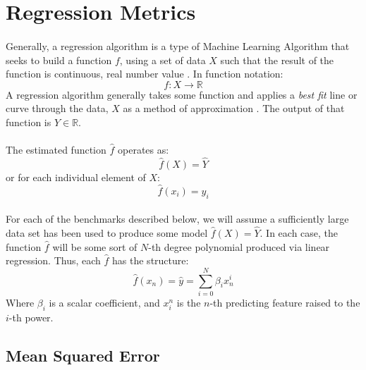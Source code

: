 \documentclass[12pt,letterpaper]{article}
\begin{document}

\section{Regression Metrics}
\paragraph*{}Generally, a regression algorithm is a type of Machine Learning Algorithm that seeks to build a function $f$, using a set of data $X$ such that the result of the function is continuous, real number value \cite{Petrik}. In function notation:
\begin{equation}
\label{regression function}
f: X \rightarrow \mathbb{R}
\end{equation}
A regression algorithm generally takes some function and applies a \textit{best fit} line or curve through the data, $X$ as a method of approximation \cite{James}. The output of that function is $Y \in \mathbb{R}$. 
\paragraph*{}The estimated function $\hat{f}$  operates as:
\begin{equation}
\hat{f}(X) = \hat{Y}
\end{equation}
or for each individual element of $X$:
\begin{equation}
\hat{f}(x_i) = \hat{y}_i
\end{equation}
\paragraph*{}For each of the benchmarks described below, we will assume a sufficiently large data set has been used to produce some model $\hat{f}(X) = \hat{Y}$. In each case, the function $\hat{f}$ will be some sort of $N$-th degree polynomial produced via linear regression. Thus, each $\hat{f}$ has the structure:
\begin{equation}
\hat{f}(x_n) = \hat{y} = \sum_{i=0}^{N} \beta_i x_n^i
\end{equation}
Where $\beta_i$ is a scalar coefficient, and $x_i^n$ is the $n$-th predicting feature raised to the $i$-th power.


\subsection{Mean Squared Error}
\end{document}
